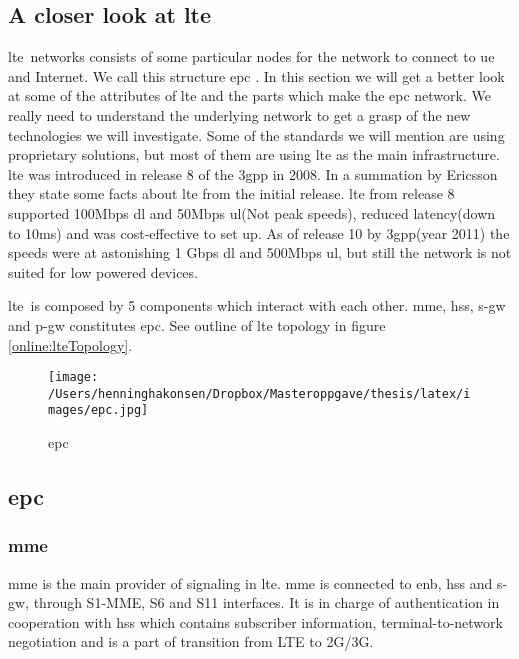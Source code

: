 \documentclass[USenglish]{ifimaster}  %
\begin{document}
\subsection{A closer look at \acrshort{lte}} \label{ssection:lte}
\acrfull{lte} networks consists of some particular nodes for the network to connect to \acrfull{ue} and Internet. We call this structure \acrfull{epc} \cite{online:epc}. In this section we will get a better look at some of the attributes of \acrshort{lte} and the parts which make the \acrshort{epc} network. We really need to understand the underlying network to get a grasp of the new technologies we will investigate. Some of the standards we will mention are using proprietary solutions, but most of them are using \acrshort{lte} as the main infrastructure. \acrshort{lte} was introduced in release 8 of the \acrshort{3gpp} in 2008. In a summation by Ericsson they state some facts about \acrshort{lte} from the initial release. \acrshort{lte} from release 8 supported 100Mbps \acrshort{dl} and 50Mbps \acrshort{ul}(Not peak speeds), reduced latency(down to 10ms) and was cost-effective to set up. \cite{online:lteIntroduction} As of release 10 by \acrshort{3gpp}(year 2011) the speeds were at astonishing 1 Gbps \acrshort{dl} and 500Mbps \acrshort{ul}, but still the network is not suited for low powered devices.


\acrshort{lte} is composed by 5 components which interact with each other. \acrshort{mme}, \acrshort{hss}, \acrshort{s-gw} and \acrshort{p-gw} constitutes \acrfull{epc}. See outline of \acrshort{lte} topology in figure \vref{online:lteTopology}.
\begin{figure}[ht]
  \centering\texttt{[image: /Users/henninghakonsen/Dropbox/Masteroppgave/thesis/latex/images/epc.jpg]}
  \caption{\acrlong{epc} \cite{online:lteTopology}}
  \label{online:lteTopology}
\end{figure}

\subsection{\acrshort{epc}}

\subsubsection{\acrshort{mme}}
\acrfull{mme} is the main provider of signaling in \acrshort{lte}. \acrshort{mme} is connected to \acrshort{enb}, \acrshort{hss} and \acrshort{s-gw}, through S1-MME, S6 and S11 interfaces. It is in charge of authentication in cooperation with \acrshort{hss} which contains subscriber information, terminal-to-network negotiation and is a part of transition from LTE to 2G/3G.
\end{document}
